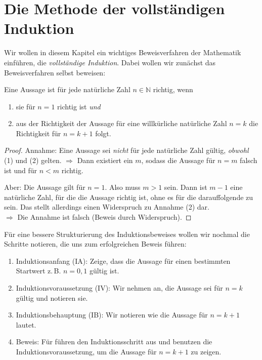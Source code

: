 \thispagestyle{plain}
\section{Die Methode der vollständigen Induktion}

Wir wollen in diesem Kapitel ein wichtiges Beweisverfahren der Mathematik einführen, die \emph{vollständige Induktion}. Dabei wollen wir zunächst das Beweisverfahren selbst beweisen:

\begin{satz}
    Eine Aussage ist für jede natürliche Zahl $n \in \mathbb{N}$ richtig, wenn 
    \begin{enumerate}
        \item sie für $n=1$ richtig ist \emph{und}
        \item aus der Richtigkeit der Aussage für eine willkürliche natürliche Zahl $n=k$ die Richtigkeit für $n=k+1$ folgt.
    \end{enumerate}
\end{satz}

\begin{proof}
    Annahme: Eine Aussage sei \emph{nicht} für jede natürliche Zahl gültig, \emph{obwohl} (1) und (2) gelten. $\Rightarrow$ Dann existiert ein $m$, sodass die Aussage für $n=m$ falsch ist und für $n < m$ richtig. 

    Aber: Die Aussage gilt für $n=1$. Also muss $m > 1$ sein. Dann ist $m-1$ eine natürliche Zahl, für die die Aussage richtig ist, ohne es für die darauffolgende zu sein. Das stellt allerdings einen Widerspruch zu Annahme (2) dar. \\
    $\Longrightarrow$ Die Annahme ist falsch (Beweis durch Widerspruch).
\end{proof}

Für eine bessere Strukturierung des Induktionsbeweises wollen wir nochmal die Schritte notieren, die uns zum erfolgreichen Beweis führen:
\begin{enumerate}
    \item Induktionsanfang (IA): Zeige, dass die Aussage für einen bestimmten Startwert z.\,B. $n=0,1$ gültig ist.
    \item Induktionsvoraussetzung (IV): Wir nehmen an, die Aussage sei für $n=k$ gültig und notieren sie. 
    \item Induktionsbehauptung (IB): Wir notieren wie die Aussage für $n=k+1$ lautet. 
    \item Beweis: Für führen den Induktionsschritt aus und benutzen die Induktionsvoraussetzung, um die Aussage für $n=k+1$ zu zeigen.
\end{enumerate}

